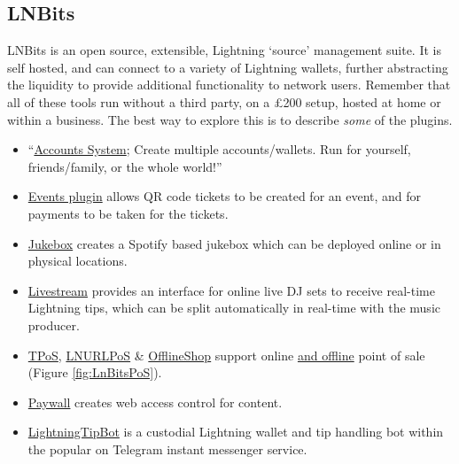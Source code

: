 \subsection{LNBits}
LNBits is an open source, extensible, Lightning `source' management suite. It is self hosted, and can connect to a variety of Lightning wallets, further abstracting the liquidity to provide additional functionality to network users. Remember that all of these tools run without a third party, on a £200 setup, hosted at home or within a business. The best way to explore this is to describe \textit{some} of the plugins. 
\begin{itemize}
\item ``\href{https://github.com/lnbits/lnbits-legend#lnbits-v03-beta-free-and-open-source-lightning-network-walletaccounts-system}{Accounts System}; Create multiple accounts/wallets. Run for yourself, friends/family, or the whole world!''
\item \href{https://github.com/lnbits/lnbits-legend/tree/quart/lnbits/extensions/events#events}{Events plugin} allows QR code tickets to be created for an event, and for payments to be taken for the tickets.
\item \href{https://github.com/lnbits/lnbits-legend/tree/quart/lnbits/extensions/jukebox#jukebox}{Jukebox} creates a Spotify based jukebox which can be deployed online or in physical locations.
\item \href{https://github.com/lnbits/lnbits-legend/tree/quart/lnbits/extensions/livestream#dj-livestream}{Livestream} provides an interface for online live DJ sets to receive real-time Lightning tips, which can be split automatically in real-time with the music producer.
\item \href{https://github.com/lnbits/lnbits-legend/tree/quart/lnbits/extensions/tpos#tpos}{TPoS}, \href{https://github.com/arcbtc/LNURLPoS#lnurlpos}{LNURLPoS} \& \href{https://github.com/lnbits/lnbits-legend/tree/quart/lnbits/extensions/watchonly#watch-only-wallet}{OfflineShop} support online \href{https://rapaygo.com/}{and offline} point of sale (Figure \ref{fig:LnBitsPoS}).
\item \href{https://github.com/lnbits/lnbits-legend/tree/quart/lnbits/extensions/paywall#paywall}{Paywall} creates web access control for content. 
\item \href{https://github.com/LightningTipBot/LightningTipBot#lightningtipbot-}{LightningTipBot} is a custodial Lightning wallet and tip handling bot within the popular on Telegram instant messenger service.
\end{itemize}
